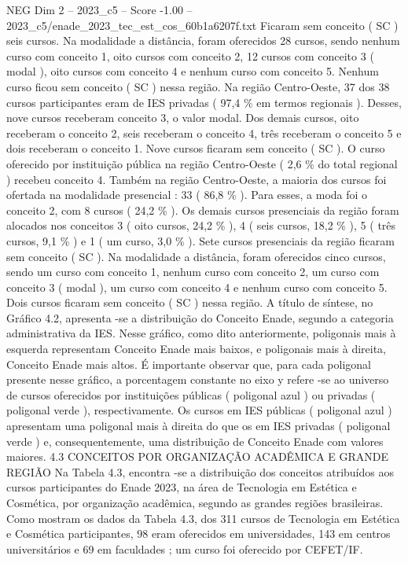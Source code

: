 \begin{textsample}{NEG Dim 2 – 2023\_c5 – Score -1.00 – 2023\_c5/enade\_2023\_tec\_est\_cos\_60b1a6207f.txt}
Ficaram sem conceito ( SC ) seis cursos.
Na modalidade a distância, foram oferecidos 28 cursos, sendo nenhum curso com conceito 1, oito cursos com conceito 2, 12 cursos com conceito 3 ( modal ), oito cursos com conceito 4 e nenhum curso com conceito 5.
Nenhum curso ficou sem conceito ( SC ) nessa região.
Na região Centro-Oeste, 37 dos 38 cursos participantes eram de IES privadas ( 97,4 \% em termos regionais ).
Desses, nove cursos receberam conceito 3, o valor modal.
Dos demais cursos, oito receberam o conceito 2, seis receberam o conceito 4, três receberam o conceito 5 e dois receberam o conceito 1.
Nove cursos ficaram sem conceito ( SC ).
O curso oferecido por instituição pública na região Centro-Oeste ( 2,6 \% do total regional ) recebeu conceito 4.
Também na região Centro-Oeste, a maioria dos cursos foi ofertada na modalidade presencial : 33 ( 86,8 \% ).
Para esses, a moda foi o conceito 2, com 8 cursos ( 24,2 \% ).
Os demais cursos presenciais da região foram alocados nos conceitos 3 ( oito cursos, 24,2 \% ), 4 ( seis cursos, 18,2 \% ), 5 ( três cursos, 9,1 \% ) e 1 ( um curso, 3,0 \% ).
Sete cursos presenciais da região ficaram sem conceito ( SC ).
Na modalidade a distância, foram oferecidos cinco cursos, sendo um curso com conceito 1, nenhum curso com conceito 2, um curso com conceito 3 ( modal ), um curso com conceito 4 e nenhum curso com conceito 5.
Dois cursos ficaram sem conceito ( SC ) nessa região.
A título de síntese, no Gráfico 4.2, apresenta -se a distribuição do Conceito Enade, segundo a categoria administrativa da IES.
Nesse gráfico, como dito anteriormente, poligonais mais à esquerda representam Conceito Enade mais baixos, e poligonais mais à direita, Conceito Enade mais altos.
É importante observar que, para cada poligonal presente nesse gráfico, a porcentagem constante no eixo y refere -se ao universo de cursos oferecidos por instituições públicas ( poligonal azul ) ou privadas ( poligonal verde ), respectivamente.
Os cursos em IES públicas ( poligonal azul ) apresentam uma poligonal mais à direita do que os em IES privadas ( poligonal verde ) e, consequentemente, uma distribuição de Conceito Enade com valores maiores. 4.3 CONCEITOS POR ORGANIZAÇÃO ACADÊMICA E GRANDE REGIÃO Na Tabela 4.3, encontra -se a distribuição dos conceitos atribuídos aos cursos participantes do Enade 2023, na área de Tecnologia em Estética e Cosmética, por organização acadêmica, segundo as grandes regiões brasileiras.
Como mostram os dados da Tabela 4.3, dos 311 cursos de Tecnologia em Estética e Cosmética participantes, 98 eram oferecidos em universidades, 143 em centros universitários e 69 em faculdades ; um curso foi oferecido por CEFET/IF.

\end{textsample}
